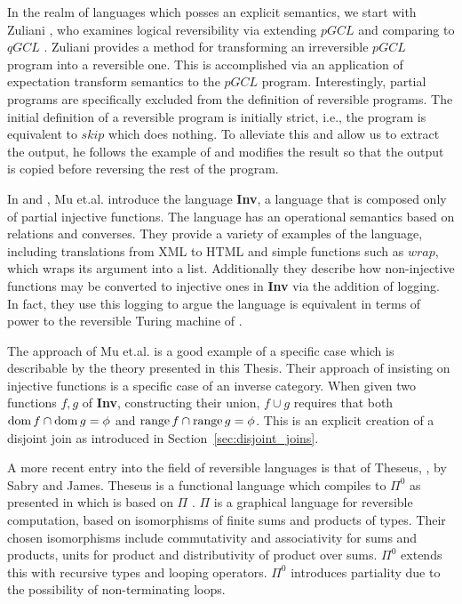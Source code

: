 In the realm of languages which posses an explicit semantics, we start with Zuliani
\cite{zuliani01:reversibility}, who examines logical reversibility via extending $pGCL$
\cite{MorganIver99} and comparing to $qGCL$ \cite{sanders:quantum}. Zuliani provides a method for
transforming an irreversible $pGCL$ program into a reversible one. This is accomplished via an
application of expectation transform semantics to the $pGCL$ program. Interestingly, partial
programs are specifically excluded from the definition of reversible programs. The initial
definition of a reversible program is initially strict, i.e., the program is equivalent to $skip$
which does nothing. To alleviate this and allow us to extract the output, he follows the example of
\cite{bennett:1973reverse} and modifies the result so that the output is copied before reversing the
rest of the program.

In \cite{mu06bidirectional} and \cite{muetal04:injreversible}, Mu et.al. introduce the language
\textbf{Inv}, a language that is composed only of partial injective functions. The language has an
operational semantics based on relations and converses. They provide a variety of examples of the
language, including translations from XML to HTML and simple functions such as $wrap$, which wraps
its argument into a list. Additionally they describe how non-injective functions may be converted to
injective ones in \textbf{Inv} via the addition of logging. In fact, they use this logging to argue
the language is equivalent in terms of power to the reversible Turing machine of
\cite{bennett:1973reverse}.

The approach of Mu et.al. is a good example of a specific case which is describable by the theory
presented in this Thesis. Their approach of insisting on injective functions is a specific case of
an inverse category. When given two functions $f,g$ of \textbf{Inv}, constructing their union,
$f\cup g$ requires that both $\operatorname*{dom} f \cap \operatorname*{dom} g = \phi$ and $\operatorname*{range} f \cap \operatorname*{range} g =
\phi$. This is an explicit creation of a disjoint join as introduced in
Section~\ref{sec:disjoint_joins}.

A more recent entry into the field of reversible languages is that of Theseus,
\cite{james2014theseus}, by Sabry and James. Theseus is a functional language which compiles to
$\Pi^0$ as presented in \cite{james2013isomorphic} which is based on $\Pi$
\cite{james2012information}.  $\Pi$ is a graphical language for reversible computation, based on
isomorphisms of finite sums and products of types. Their chosen isomorphisms include commutativity
and associativity for sums and products, units for product and distributivity of product over
sums. $\Pi^0$ extends this with recursive types and looping operators. $\Pi^0$ introduces partiality
due to the possibility of non-terminating loops.

